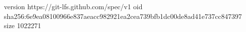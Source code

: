 version https://git-lfs.github.com/spec/v1
oid sha256:6e9ea08100966e837aeacc982921ea2cea739bfb1dc00de8ad41e737cc847397
size 1022271
